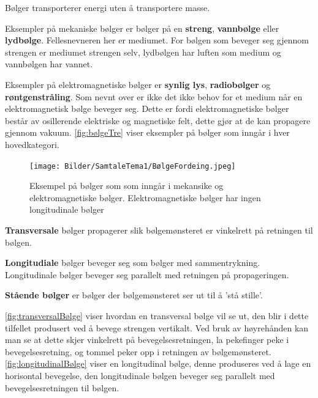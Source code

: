 \begin{definition}
    \label{def:wave}
    Bølger transporterer energi uten å transportere masse.
\end{definition}

Eksempler på mekaniske bølger er bølger på en \textbf{streng}, \textbf{vannbølge} eller \textbf{lydbølge}. Fellesnevneren her er mediumet. For bølgen som beveger seg gjennom strengen er mediumet strengen selv, lydbølgen har luften som medium og vannbølgen har vannet.

Eksempler på elektromagnetiske bølger er \textbf{synlig lys}, \textbf{radiobølger} og \textbf{røntgenstråling}. Som nevnt over er ikke det ikke behov for et medium når en elektromagnetisk bølge beveger seg. Dette er fordi elektromagnetiske bølger består av osillerende elektriske og magnetiske felt, dette gjør at de kan propagere gjennom vakuum. \autoref{fig:bølgeTre} viser eksempler på bølger som inngår i hver hovedkategori.

\begin{figure}[!htb]
    \centering
    \texttt{[image: Bilder/SamtaleTema1/BølgeFordeing.jpeg]}
    \caption{Eksempel på bølger som som inngår i mekansike og elektromagnetiske bølger. Elektromagnetiske bølger har ingen longitudinale bølger}
    \label{fig:bølgeTre}
\end{figure}


\begin{definition}
\label{def:Transversale}
    \textbf{Transversale} bølger propagerer slik bølgemønsteret er vinkelrett på retningen til bølgen.
\end{definition}

\begin{definition}
\label{def:longitudinale}
    \textbf{Longitudiale} bølger beveger seg som bølger med sammentrykning. Longitudinale bølger beveger seg parallelt med retningen på propageringen.
\end{definition}

\begin{definition}
\label{def:ståendeBølge}
    \textbf{Stående bølger} er bølger der bølgemønsteret ser ut til å 'stå stille'.
\end{definition}

\autoref{fig:transversalBølge} viser hvordan en transversal bølge vil se ut, den blir i dette tilfellet produsert ved å bevege strengen vertikalt. Ved bruk av høyrehånden kan man se at dette skjer vinkelrett på bevegelsesretningen, la pekefinger peke i bevegelsesretning, og tommel peker opp i retningen av bølgemønsteret. \autoref{fig:longitudinalBølge} viser en longitudinal bølge, denne produseres ved å lage en horisontal bevegelse, den longitudinale bølgen beveger seg parallelt med bevegelsesretningen til bølgen. 

